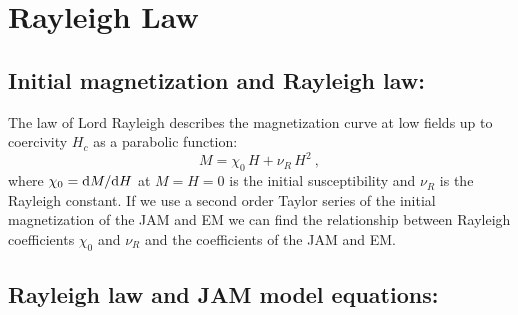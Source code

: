 \documentclass[../main.tex]{subfiles}
\begin{document}
\section{Rayleigh Law}

\subsection{Initial magnetization and Rayleigh law:}

The law of Lord Rayleigh describes the magnetization curve at low fields up to coercivity $H_c$ as a parabolic function:
\begin{equation}
  M = \chi_0\,H+\nu_R\,H^2 \ ,
  \label{MRy}
\end{equation}
where $\chi_0={\rm d} M/{\rm d} H$ at $M=H=0$ is the initial susceptibility and $\nu_R$ is the Rayleigh constant. If we use a second order Taylor series of the initial magnetization of the JAM and EM we can find the relationship between Rayleigh coefficients $\chi_0$ and $\nu_R$ and the coefficients of the JAM and EM.

\subsection{Rayleigh law and JAM model equations:}
\end{document}

